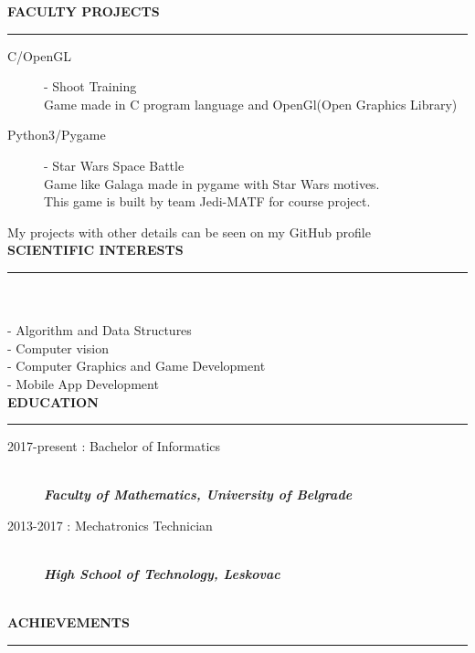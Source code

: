 \documentclass{article}
\begin{document}
\color{my_col}
\textbf{\large FACULTY PROJECTS}\\
\noindent\rule{15.4cm}{1.6pt}\color{black}
\begin{description}
	\item[ C/OpenGL] - Shoot Training\\ 
	Game made in C program language and OpenGl(Open Graphics Library)
	\item[ Python3/Pygame] - Star Wars Space Battle\\ 
	Game like Galaga made in pygame with Star Wars motives.\\
	This game is built by team Jedi-MATF for course project.
\end{description}
My projects with other details can be seen on my GitHub profile \\

\color{my_col}
\textbf{\large SCIENTIFIC INTERESTS}\\
\noindent\rule{15.4cm}{1.6pt}\color{black}\\\\
- Algorithm and Data Structures\\
- Computer vision \\
- Computer Graphics and Game Development\\
- Mobile App Development\\

\color{my_col}
\textbf{\large EDUCATION}\\
\noindent\rule{15.4cm}{1.6pt}\color{black}
\begin{description}
    \item[ 2017-present : Bachelor of Informatics ]\hfill \\
    \textbf{\textit{Faculty of Mathematics, University of Belgrade}}\\
\end{description}

\begin{description}
    \item[ 2013-2017 : Mechatronics Technician]\hfill \\
    \textbf{\textit{High School of Technology, Leskovac}}\\
    \normalsize \\
  
\end{description}
\color{my_col}
\textbf{\large ACHIEVEMENTS}\\
\noindent\rule{15.4cm}{1.6pt}\color{black}
\normalsize
\end{document}
